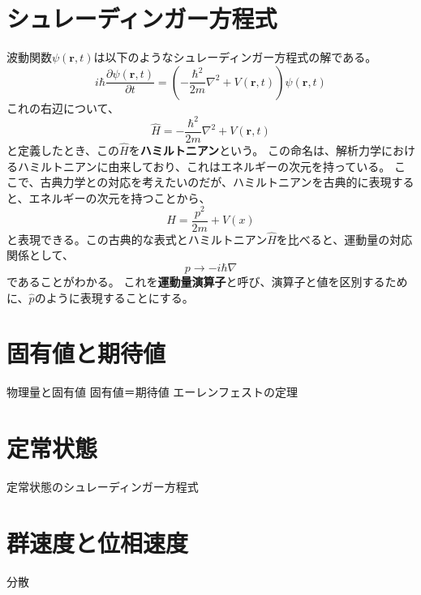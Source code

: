 \documentclass[a4paper]{jsreport}
\begin{document}
        \section{シュレーディンガー方程式}
            波動関数$\psi(\boldsymbol{r}, t)$は以下のようなシュレーディンガー方程式の解である。
            \begin{equation}
                i \hbar \frac{\partial \psi(\boldsymbol{r}, t)}{\partial t} = \left( -\frac{\hbar^2}{2m} \nabla^2 + V(\boldsymbol{r}, t)\right) \psi(\boldsymbol{r}, t)
            \end{equation}
            これの右辺について、
            \begin{equation}
                \hat{H} = -\frac{\hbar^2}{2m} \nabla^2 + V(\boldsymbol{r}, t)
            \end{equation}
            と定義したとき、この$\hat{H}$を\textbf{ハミルトニアン}という。
            この命名は、解析力学におけるハミルトニアンに由来しており、これはエネルギーの次元を持っている。
            ここで、古典力学との対応を考えたいのだが、ハミルトニアンを古典的に表現すると、エネルギーの次元を持つことから、
            \begin{equation}
                H = \frac{p^2}{2m} + V(x)
            \end{equation}
            と表現できる。この古典的な表式とハミルトニアン$\hat{H}$を比べると、運動量の対応関係として、
            \begin{equation}
                p \rightarrow -i \hbar \nabla
            \end{equation}
            であることがわかる。
            これを\textbf{運動量演算子}と呼び、演算子と値を区別するために、$\hat{p}$のように表現することにする。

        \section{固有値と期待値}
            物理量と固有値
            固有値＝期待値
            エーレンフェストの定理

        \section{定常状態}
            定常状態のシュレーディンガー方程式

        \section{群速度と位相速度}
            分散
\end{document}
